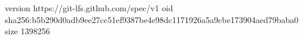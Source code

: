version https://git-lfs.github.com/spec/v1
oid sha256:b5b290d0adb9ee27cc51ef9387be4e98dc1171926a5a9cbe173904aed79baba0
size 1398256
